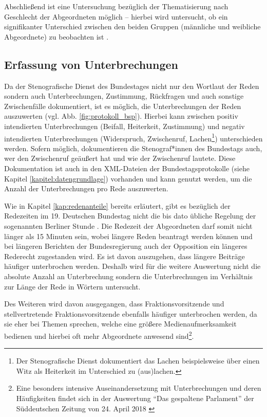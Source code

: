 \documentclass[12pt, 
    twoside=false, 
    bibliography=totoc, 
    numbers=endperiod, 
    headings=normal, 
    toc=chapterentrydotfill
    ]{scrbook}
\begin{document}
Abschließend ist eine Untersuchung bezüglich der Thematisierung nach Geschlecht der Abgeordneten möglich -- hierbei wird untersucht, ob ein signifikanter Unterschied zwischen den beiden Gruppen (männliche und weibliche Abgeordnete) zu beobachten ist \parencite[vgl.][3]{roberts_2013}. 


\subsection{Erfassung von Unterbrechungen}

Da der Stenografische Dienst des Bundestages nicht nur den Wortlaut der Reden sondern auch Unterbrechungen, Zustimmung, Rückfragen und auch sonstige Zwischenfälle dokumentiert, ist es möglich, die Unterbrechungen der Reden auszuwerten (vgl. Abb. \ref{fig:protokoll_bsp}). Hierbei kann zwischen positiv intendierten Unterbrechungen (Beifall, Heiterkeit, Zustimmung) und negativ intendierten Unterbrechungen (Widerspruch, Zwischenruf, Lachen\footnote{Der Stenografische Dienst dokumentiert das Lachen beispielsweise über einen Witz als Heiterkeit im Unterschied zu (aus)lachen.}) unterschieden werden.
Sofern möglich, dokumentieren die Stenograf*innen des Bundestags auch, wer den Zwischenruf geäußert hat und wie der Zwischenruf lautete. Diese Dokumentation ist auch in den XML-Dateien der Bundestagsprotokolle (siehe Kapitel \ref{kapitel:datengrundlage}) vorhanden und kann genutzt werden, um die Anzahl der Unterbrechungen pro Rede auszuwerten.

Wie in Kapitel \ref{kap:redenanteile} bereits erläutert, gibt es bezüglich der Redezeiten im 19. Deutschen Bundestag nicht die bis dato übliche Regelung der sogenannten Berliner Stunde \parencite[vgl.][]{schreiner_2005}. Die Redezeit der Abgeordneten darf somit nicht länger als 15 Minuten sein, wobei längere Reden beantragt werden können und bei längeren Berichten der Bundesregierung auch der Opposition ein längeres Rederecht zugestanden wird. Es ist davon auszugehen, dass längere Beiträge häufiger unterbrochen werden. Deshalb wird für die weitere Auswertung nicht die absolute Anzahl an Unterbrechung sondern die Unterbrechungen im Verhältnis zur Länge der Rede in Wörtern untersucht.

Des Weiteren wird davon ausgegangen, dass Fraktionsvorsitzende und stellvertretende Fraktionsvorsitzende ebenfalls häufiger unterbrochen werden, da sie eher bei Themen sprechen, welche eine größere Medienaufmerksamkeit bedienen und hierbei oft mehr Abgeordnete anwesend sind\footnote{Eine besonders intensive Auseinandersetzung mit Unterbrechungen und deren Häufigkeiten findet sich in der Auswertung \enquote{Das gespaltene Parlament} der Süddeutschen Zeitung von 24. April 2018 \parencite{sueddeutsche_2018}}.
\end{document}
